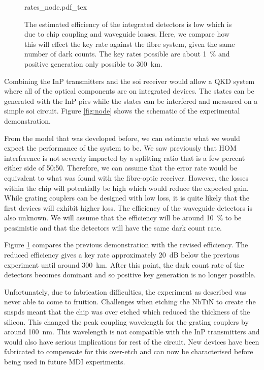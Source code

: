 \begin{figure}[t]
	\centering
	\small
	\def\svgwidth{0.8\textwidth} 
	{rates_node.pdf_tex}
	\caption[Estimated key rates for integrated SOI receiver]{The estimated efficiency of the integrated detectors is low which is due to chip coupling and waveguide losses. Here, we compare how this will effect the key rate against the fibre system, given the same number of dark counts. The key rates possible are about \SI{1}{\percent} and positive generation only possible to \SI{300}{\km}.}
	\label{fig:rates_node}
\end{figure}

Combining the \ac{InP} transmitters and the \ac{soi} receiver would allow a \ac{QKD} system where all of the optical components are on integrated devices. The states can be generated with the \ac{InP} \acp{pic} while the states can be interfered and measured on a simple \ac{soi} circuit. Figure \ref{fig:node} shows the schematic of the experimental demonstration.

From the model that was developed before, we can estimate what we would expect the performance of the system to be. We saw previously that \ac{HOM} interference is not severely impacted by a splitting ratio that is a few percent either side of 50:50. Therefore, we can assume that the error rate would be equivalent to what was found with the fibre-optic receiver. However, the losses within the chip will potentially be high which would reduce the expected gain. While grating couplers can be designed with low loss, it is quite likely that the first devices will exhibit higher loss. The efficiency of the waveguide detectors is also unknown. We will assume that the efficiency will be around \SI{10}{\percent} to be pessimistic and that the detectors will have the same dark count rate. 

Figure \ref{fig:rates_node} compares the previous demonstration with the revised efficiency. The reduced efficiency gives a key rate approximately \SI{20}{dB} below the previous experiment until around \SI{300}{km}. After this point, the dark count rate of the detectors becomes dominant and so positive key generation is no longer possible. 

Unfortunately, due to fabrication difficulties, the experiment as described was never able to come to fruition. Challenges when etching the \ac{NbTiN} to create the \acp{snspd} meant that the chip was over etched which reduced the thickness of the silicon. This changed the peak coupling wavelength for the grating couplers by around \SI{100}{nm}. This wavelength is not compatible with the \ac{InP} transmitters and would also have serious implications for rest of the circuit. New devices have been fabricated to compensate for this over-etch and can now be characterised before being used in future \ac{MDI} experiments.

